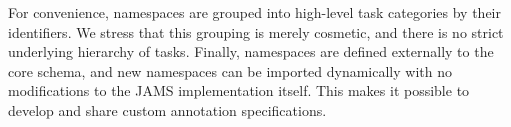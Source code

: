 \documentclass{article}
\begin{document}

For convenience, namespaces are grouped into high-level task categories by their identifiers.
We stress that this grouping is merely cosmetic, and there is no strict underlying hierarchy of tasks.
Finally, namespaces are defined externally to the core schema, and new namespaces can be imported dynamically with no modifications to the JAMS implementation itself.
This makes it possible to develop and share custom annotation specifications.
\end{document}
